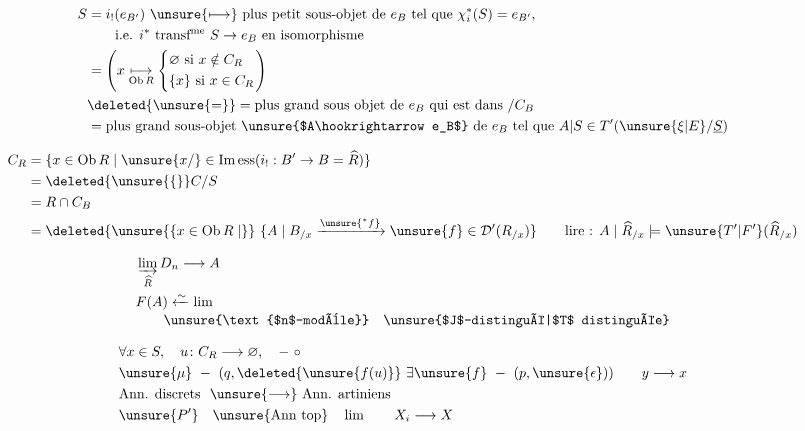\[
\begin{aligned}
 S&=i_!(e_{B'})\ \unsure{\longmapsto}\ \text{plus petit sous-objet de $e_B$ tel que }
 \chi_i^*(S)=e_{B'},\\
 &\hspace{2em}\text{i.e. $i^*$ transf\textsuperscript{me} $S\to e_B$ en isomorphisme}\\
 &=\left(x\underset{\operatorname{Ob} R}{\longmapsto}
 \left\{\begin{aligned}&\varnothing\ \text{si }x\notin C_R\\&\{x\}\ \text{si }x\in C_R\end{aligned}\right.\right)\\
 &\deleted{\unsure{=}}=\text{plus grand sous objet de $e_B$ qui est dans }/C_B\\
 &=\text{plus grand sous-objet \unsure{$A\hookrightarrow e_B$} de $e_B$ tel que }
 A|S\in T'(\unsure{\xi|E}/\underline S)
\end{aligned}
\]

\[
\begin{aligned}
 C_R&=\{x\in\operatorname{Ob} R\mid \unsure{x/} \in\operatorname{Im\,ess}(i_!:B'\to B=\widehat R)\}\\
 &=\deleted{\unsure{\{}} C/S\\
 &=R\cap C_B\\
 &=\deleted{\unsure{\{x\in\operatorname{Ob}R\mid}}\ \{A\mid B_{/x}\xrightarrow{\unsure{{}^*f}}
 \unsure{f} \in\mathcal D'(R_{/x})\}\qquad
 \text{lire : }A\mid\widehat R_{/x}\models\unsure{T'|F'}(\widehat R_{/x})
\end{aligned}
\]

\[
\begin{aligned}
 &\varinjlim_{\widehat R}D_n\longrightarrow A\\
 &F(A)\xleftarrow{\sim}\lim\\[-2pt]
 &\hspace{2em}\unsure{\text{$n$-modèle}}\quad
 \text{\unsure{$J$-distingué|$T$ distinguée}}
\end{aligned}
\]

\[
\begin{aligned}
 &\forall x\in S,\quad u\colon C_R\longrightarrow \varnothing,\quad -\ \circ\\
 &\unsure{\mu}\ -\ (q,\deleted{\unsure{f(u)}}\ \exists\unsure{f}\ -\ (p,\unsure{\epsilon}))\qquad y\longrightarrow x\\
 &\text{Ann. discrets }\ \unsure{\longrightarrow}\ \text{Ann. artiniens}\\
 &\unsure{P'}\quad\unsure{\text{Ann top}}\quad \lim\qquad X_i\longrightarrow X
\end{aligned}
\]

